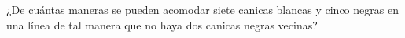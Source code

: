 ¿De cuántas maneras se pueden acomodar siete canicas blancas y cinco negras en una línea de tal manera que no haya dos canicas negras vecinas?
